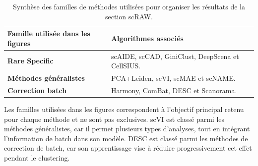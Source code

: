 \begin{table}[H]
\centering
\small
\renewcommand{\arraystretch}{1.15}
\begin{tabularx}{\textwidth}{@{}p{}X@{}}
\toprule
\textbf{Famille utilisée dans les figures} & \textbf{Algorithmes associés} \\
\midrule
\textbf{Rare Specific} & scAIDE, scCAD, GiniClust, DeepScena et CellSIUS. \\
\textbf{Méthodes généralistes} & PCA+Leiden, scVI, scMAE et scNAME. \\
\textbf{Correction batch} & Harmony, ComBat, DESC et Scanorama. \\
\bottomrule
\end{tabularx}
\caption{Synthèse des familles de méthodes utilisées pour organiser les résultats de la section scRAW.}
\label{tab:scraw_method_families}
\end{table}

Les familles utilisées dans les figures correspondent à l'objectif principal retenu pour chaque méthode et ne sont pas exclusives. scVI est classé parmi les méthodes généralistes, car il permet plusieurs types d'analyses, tout en intégrant l'information de batch dans son modèle. DESC est classé parmi les méthodes de correction de batch, car son apprentissage vise à réduire progressivement cet effet pendant le clustering.

